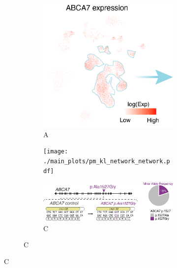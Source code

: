 \documentclass[12pt]{article}
\begin{document}
\begin{figure}[H]
    \captionsetup[subfigure]{labelformat=empty}
    \begin{subfigure}[t]{0.47\textwidth}
        \begin{subfigure}[t]{0.49\textwidth}
            \caption{A}
            \includegraphics[width=\textwidth]{./main_plots/cell_projection_abca7_expression.png}        
        \end{subfigure}
        \begin{subfigure}[t]{0.49\textwidth}
\vspace{1cm}
            \texttt{[image: ./main\_plots/pm\_kl\_network\_network.pdf]}        
        \end{subfigure}
        \begin{subfigure}[t]{\textwidth}
            \caption{C}
            \includegraphics[width=\textwidth]{./main_plots/common_variant_cartoon.png}        
        \end{subfigure}
    \end{subfigure}

\end{figure}
\end{document}
